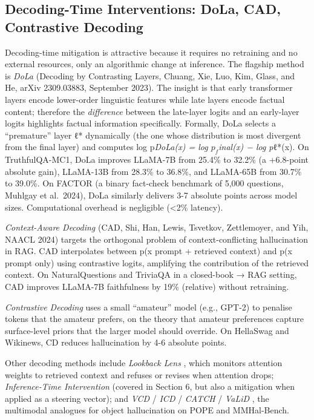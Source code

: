 \documentclass{article}
\begin{document}
\subsection{Decoding-Time Interventions: DoLa, CAD, Contrastive Decoding}\label{decoding-time-interventions-dola-cad-contrastive-decoding}

Decoding-time mitigation is attractive because it requires no retraining and no external resources, only an algorithmic change at inference. The flagship method is \emph{DoLa} (Decoding by Contrasting Layers, Chuang, Xie, Luo, Kim, Glass, and He, arXiv 2309.03883, September 2023). The insight is that early transformer layers encode lower-order linguistic features while late layers encode factual content; therefore the \emph{difference} between the late-layer logits and an early-layer logits highlights factual information specifically. Formally, DoLa selects a ``premature'' layer ℓ* dynamically (the one whose distribution is most divergent from the final layer) and computes log p\emph{DoLa(x) = log \(p_f\)inal(x) − log p}ℓ*(x). On TruthfulQA-MC1, DoLa improves LLaMA-7B from 25.4\% to 32.2\% (a +6.8-point absolute gain), LLaMA-13B from 28.3\% to 36.8\%, and LLaMA-65B from 30.7\% to 39.0\%. On FACTOR (a binary fact-check benchmark of 5,000 questions, Muhlgay et al.~2024), DoLa similarly delivers 3-7 absolute points across model sizes. Computational overhead is negligible (\textless2\% latency).

\emph{Context-Aware Decoding} (CAD, Shi, Han, Lewis, Tsvetkov, Zettlemoyer, and Yih, NAACL 2024) targets the orthogonal problem of context-conflicting hallucination in RAG. CAD interpolates between p(x \textbar{} prompt + retrieved context) and p(x \textbar{} prompt only) using contrastive logits, amplifying the contribution of the retrieved context. On NaturalQuestions and TriviaQA in a closed-book → RAG setting, CAD improves LLaMA-7B faithfulness by 19\% (relative) without retraining.

\emph{Contrastive Decoding} \citep{li2023haluevalalargescal} uses a small ``amateur'' model (e.g., GPT-2) to penalise tokens that the amateur prefers, on the theory that amateur preferences capture surface-level priors that the larger model should override. On HellaSwag and Wikinews, CD reduces hallucination by 4-6 absolute points.

Other decoding methods include \emph{Lookback Lens} \citep{chuang2023doladecodingbycont}, which monitors attention weights to retrieved context and refuses or revises when attention drops; \emph{Inference-Time Intervention} (covered in Section 6, but also a mitigation when applied as a steering vector); and \emph{VCD} / \emph{ICD} / \emph{CATCH} / \emph{VaLiD} \citep{wang2024factualityoflargel}, the multimodal analogues for object hallucination on POPE and MMHal-Bench.
\end{document}
